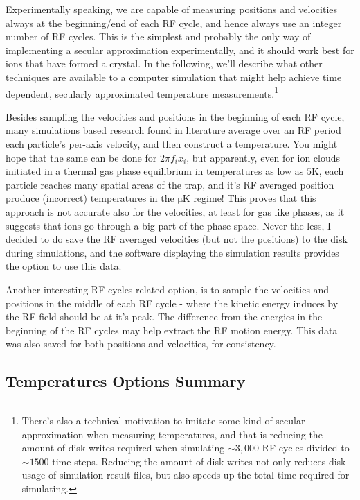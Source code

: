 Experimentally speaking, we are capable of measuring positions and velocities always at the beginning/end of each RF cycle, and hence always use an integer number of RF cycles. This is the simplest and probably the only way of implementing a secular approximation experimentally, and it should work best for ions that have formed a crystal. In the following, we'll describe what other techniques are available to a computer simulation that might help achieve time dependent, secularly approximated temperature measurements.\footnote{There's also a technical motivation to imitate some kind of secular approximation when measuring temperatures, and that is reducing the amount of disk writes required when simulating $\sim 3,000$ RF cycles divided to $\sim 1500$ time steps. Reducing the amount of disk writes not only reduces disk usage of simulation result files, but also speeds up the total time required for simulating.}

Besides sampling the velocities and positions in the beginning of each RF cycle, many simulations based research found in literature average over an RF period each particle's per-axis velocity, and then construct a temperature. You might hope that the same can be done for $2\pi f_i x_i$, but apparently, even for ion clouds initiated in a thermal gas phase equilibrium in temperatures as low as $5\mathrm{K}$, each particle reaches many spatial areas of the trap, and it's RF averaged position produce (incorrect) temperatures in the $\mathrm{\mu K}$ regime! This proves that this approach is not accurate also for the velocities, at least for gas like phases, as it suggests that ions go through a big part of the phase-space. Never the less, I decided to do save the RF averaged velocities (but not the positions) to the disk during simulations, and the software displaying the simulation results provides the option to use this data.

Another interesting RF cycles related option, is to sample the velocities and positions in the middle of each RF cycle - where the kinetic energy induces by the RF field should be at it's peak. The difference from the energies in the beginning of the RF cycles may help extract the RF motion energy. This data was also saved for both positions and velocities, for consistency.

\subsection{Temperatures Options Summary}\label{ssec:T-options-summery}


